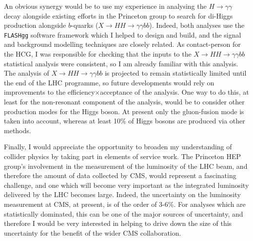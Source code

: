 \documentclass[11pt,a4paper,sans]{moderncv}        %
\begin{document}
An obvious synergy would be to use my experience in analysing the $H \rightarrow \gamma \gamma$ decay alongside existing efforts in the Princeton group to search for di-Higgs production alongside $b$-quarks ($X \rightarrow HH \rightarrow \gamma \gamma bb$). Indeed, both analyses use the \texttt{FLASHgg} software framework which I helped to design and build, and the signal and background modelling techniques are closely related. As contact-person for the HCG, I was responsible for checking that the inputs to the $X \rightarrow HH \rightarrow \gamma \gamma bb$ statistical analysis were consistent, so I am already familiar with this analysis. The analysis of $X \rightarrow HH \rightarrow \gamma \gamma bb$ is projected to remain statistically limited until the end of the LHC programme, so future developments would rely on improvements to the efficiency$\times$acceptance of the analysis. One way to do this, at least for the non-resonant component of the analysis, would be to consider other production modes for the Higgs boson. At present only the gluon-fusion mode is taken into account, whereas at least 10\% of Higgs bosons are produced via other methods.  

Finally, I would appreciate the opportunity to broaden my understanding of collider physics by taking part in elements of service work. The Princeton HEP group's involvement in the measurement of the luminosity of the LHC beam, and therefore the amount of data collected by CMS, would represent a fascinating challenge, and one which will become very important as the integrated luminosity delivered by the LHC becomes large. Indeed, the uncertainty on the luminosity measurement at CMS, at present, is of the order of 3-6\%. For analyses which are statistically dominated, this can be one of the major sources of uncertainty, and therefore I would be very interested in helping to drive down the size of this uncertainty for the benefit of the wider CMS collaboration.

\makeletterclosing
\end{document}
